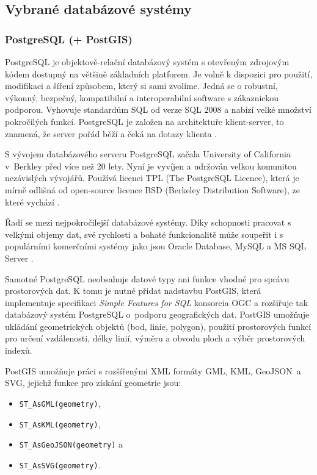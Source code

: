 \subsection{Vybrané databázové systémy}
\label{kPouziteProstredky}

\subsubsection{PostgreSQL (+ PostGIS)}
        \label{kPostgreSQL}

PostgreSQL je objektově-relační databázový systém s otevřeným zdrojovým kódem dostupný na většině základních platforem. Je volně k dispozici pro použití, modifikaci a šíření způsobem, který si sami zvolíme. Jedná se o robustní, výkonný, bezpečný, kompatibilní a interoperabilní software s zákaznickou podporou. Vyhovuje standardům SQL od verze SQL 2008 a nabízí velké množství pokročilých funkcí. PostgreSQL je založen na architektuře klient-server, to znamená, že server pořád běží a čeká na dotazy klienta \citep{Momjian2001}. 

S vývojem databázového serveru PostgreSQL začala University of California v~Berkley před více než 20 lety. Nyní je vyvíjen a udržován velkou komunitou nezávislých vývojářů. Používá licenci TPL (The PostgreSQL Licence), která je mírně odlišná od open-source licence BSD (Berkeley Distribution Software), ze které vychází \citep{RiggsKrossing2010}.

Řadí se mezi nejpokročilejší databázové systémy. Díky schopnosti pracovat s velkými objemy dat, své rychlosti a bohaté funkcionalitě může soupeřit i s populárními komerčními systémy jako jsou Oracle Database, MySQL a MS SQL Server \citep{PostgreSQL2012}.

Samotné PostgreSQL neobsahuje datové typy ani funkce vhodné pro správu prostorových dat. K tomu je nutné přidat nadstavbu PostGIS, která implementuje specifikaci {\it Simple Features for SQL} konsorcia OGC a rozšiřuje tak databázový systém PostgreSQL o~podporu geografických dat. PostGIS umožňuje ukládání geometrických objektů (bod, linie, polygon), použití prostorových funkcí pro určení vzdálenosti, délky linií, výměru a obvodu ploch a výběr prostorových indexů.

PostGIS umožňuje práci s rozšířenými XML formáty GML, KML, GeoJSON~a SVG, jejichž funkce pro získání geometrie jsou:
\begin{itemize}
\item \texttt{ST\_AsGML(geometry)},
\item \texttt{ST\_AsKML(geometry)},
\item \texttt{ST\_AsGeoJSON(geometry)} a 
\item \texttt{ST\_AsSVG(geometry)}.
\end{itemize}

